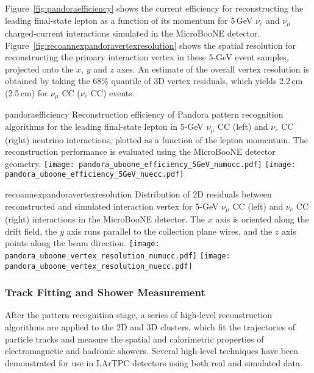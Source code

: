 Figure~\ref{fig:pandoraefficiency} shows the current efficiency for reconstructing
the leading final-state lepton as a function of its momentum
for 5\,GeV $\nu_{e}$ and $\nu_{\mu}$ charged-current interactions
simulated in the MicroBooNE detector.
Figure~\ref{fig:recoannexpandoravertexresolution} shows the spatial resolution for
reconstructing the primary interaction vertex in these 5-GeV event samples,
projected onto the $x$, $y$ and $z$ axes. An estimate of the overall vertex 
resolution is obtained by taking the 68\% quantile of 3D vertex residuals, 
which yields 2.2\,cm (2.5\,cm) for $\nu_{\mu}$ CC ($\nu_{e}$ CC) events.

\begin{cdrfigure}{pandoraefficiency}
{Reconstruction efficiency of Pandora pattern recognition algorithms
 for the leading final-state lepton in 5-GeV $\nu_{\mu}$ CC (left) and
 $\nu_{e}$ CC (right) neutrino interactions, plotted as a function of
 the lepton momentum. The reconstruction performance is evaluated
 using the MicroBooNE detector geometry. }
\texttt{[image: pandora\_uboone\_efficiency\_5GeV\_numucc.pdf]}
\texttt{[image: pandora\_uboone\_efficiency\_5GeV\_nuecc.pdf]}
\end{cdrfigure}

\begin{cdrfigure}{recoannexpandoravertexresolution}
{Distribution of 2D residuals between reconstructed and simulated interaction
 vertex for 5-GeV $\nu_{\mu}$ CC (left) and $\nu_{e}$ CC (right) interactions in the MicroBooNE detector.
 The $x$ axis is oriented along the drift field, the $y$ axis runs parallel 
 to the collection plane wires, and the $z$ axis points along the beam direction.}
\texttt{[image: pandora\_uboone\_vertex\_resolution\_numucc.pdf]}
\texttt{[image: pandora\_uboone\_vertex\_resolution\_nuecc.pdf]}
\end{cdrfigure}

\subsubsection{Track Fitting and Shower Measurement}

After the pattern recognition stage, a series of high-level reconstruction
algorithms are applied to the 2D and 3D clusters,
which fit the trajectories of particle tracks and measure the
spatial and calorimetric properties of electromagnetic and hadronic showers.
Several high-level techniques have been demonstrated 
for use in LArTPC detectors using both real and simulated data.

